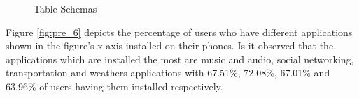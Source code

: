 \begin{figure}[htp]
\hspace{1em}
\newline
\centering
{}

\caption{Table Schemas}
\label{fig:s3}
\end{figure}

Figure \ref{fig:pre_6} depicts the percentage of users who have different applications shown in the figure's x-axis installed on their phones. Is it observed that the applications which are installed the most are music and audio, social networking, transportation and weathers applications with 67.51\%, 72.08\%, 67.01\% and 63.96\% of users having them installed respectively.

